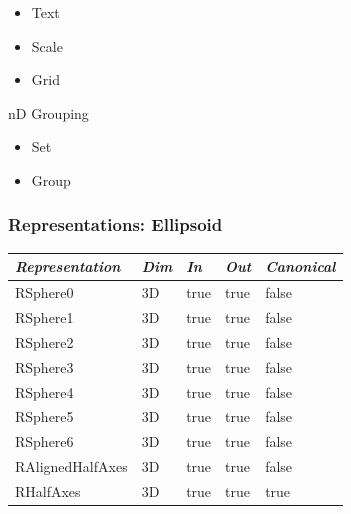 \documentclass{beamer}
\begin{document}
{\begin{center}
{\begin{itemize}
        \begin{itemize}
        \item Text
        \item Scale
        \item Grid
        \end{itemize}
      \end{itemize}
    \item nD Grouping
      \begin{itemize}
      \item Set
      \item Group
      \end{itemize}
    }
  \end{center}
}


\begin{frame}[fragile]
  \frametitle{Representations: Ellipsoid}
\centering
\begin{tabular}{lllll}
\textit{Representation} & \textit{Dim} & \textit{In} & \textit{Out} & \textit{Canonical} \\
\toprule
RSphere0         & 3D & true & true & false \\
RSphere1         & 3D & true & true & false \\
RSphere2         & 3D & true & true & false \\
RSphere3         & 3D & true & true & false \\
RSphere4         & 3D & true & true & false \\
RSphere5         & 3D & true & true & false \\
RSphere6         & 3D & true & true & false \\
RAlignedHalfAxes & 3D & true & true & false \\
RHalfAxes        & 3D & true & true & true
\end{tabular}
\end{frame}
\end{document}
